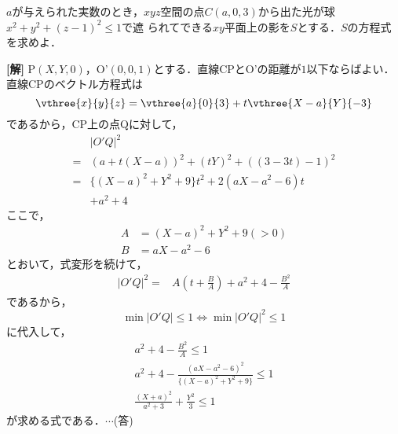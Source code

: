 \documentclass[a4j]{jarticle}
\begin{document}

     \begin{oframed}
     $a$が与えられた実数のとき，$xyz$空間の点$C(a,0,3)$から出た光が球$x^2+y^2+(z-1)^2\le1$で遮
     られてできる$xy$平面上の影を$S$とする．$S$の方程式を求めよ．
     \end{oframed}

\setlength{\columnseprule}{0.4pt}
\begin{multicols}{2}
{\bf[解]} P$(X,Y,0)$，O'$(0,0,1)$とする．直線CPとO'の距離が$1$以下ならばよい．
直線CPのベクトル方程式は 
     \[\vthree{x}{y}{z}=\vthree{a}{0}{3}+t\vthree{X-a}{Y}{-3}\]
であるから，CP上の点Qに対して，
     \begin{align*}
     &|O'Q|^2 \\
     =&(a+t(X-a))^2+(tY)^2+((3-3t)-1)^2 \\
     =&\{(X-a)^2+Y^2+9\}t^2+2(aX-a^2-6)t \\
     &+a^2+4 
     \end{align*}
ここで，
     \begin{align*}
     A&=(X-a)^2+Y^2+9(>0) \\
     B&=aX-a^2-6
     \end{align*}
とおいて，式変形を続けて，
     \begin{align*}
     |O'Q|^2=&A\left(t+\frac{B}{A}\right)+a^2+4-\frac{B^2}{A}
     \end{align*}
であるから，
     \[\min|O'Q|\le1\Longleftrightarrow\min|O'Q|^2\le1\]
に代入して，     
     \begin{align*}
     a^2+4-\frac{B^2}{A}\le1 \\
     a^2+4-\frac{(aX-a^2-6)^2}{\{(X-a)^2+Y^2+9\}}\le1 \\
     \frac{(X+a)^2}{a^2+3}+\frac{Y^2}{3}\le1
     \end{align*}
が求める式である．$\cdots$(答)

\newpage
\end{multicols}
\end{document}
